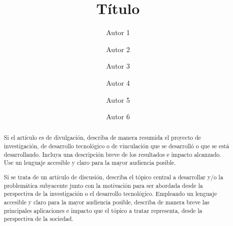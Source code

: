 \documentclass[sigconf]{acmart}
\begin{document}
\title{T\'itulo}

\author{Autor 1}
\author{Autor 2}
\authornotemark[1]

\author{Autor 3}

\author{Autor 4}

\author{Autor 5}

\author{Autor 6}

\renewcommand{\shortauthors}{Autor 1, et al.}
\renewcommand{\tablename}{Tabla}
\begin{abstract}
Si el artículo es de divulgación, describa de manera resumida el proyecto de investigación, de desarrollo tecnológico o de vinculación que se desarrolló o que se está desarrollando. Incluya una descripción breve de los resultados e impacto alcanzado. Use un lenguaje accesible y claro para la mayor audiencia posible.
	
Si se trata de un artículo de discusión, describa el tópico central a desarrollar y/o la problemática subyacente junto con la motivación para ser abordada desde la perspectiva de la investigación o el desarrollo tecnológico. Empleando un lenguaje accesible y claro para la mayor audiencia posible, describa de manera breve las principales aplicaciones e impacto que el tópico a tratar representa, desde la perspectiva de la sociedad.
\end{abstract}
\end{document}
